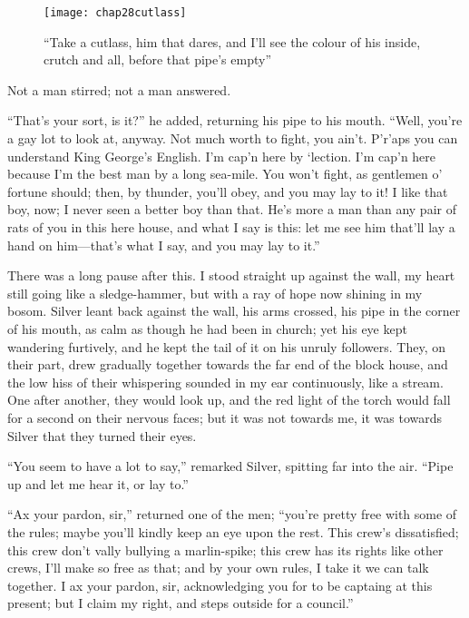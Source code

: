 \begin{sidewaysfigure}
\texttt{[image: chap28cutlass]}%
\caption[\enquote{Take a cutlass, him that dares}]{\enquote{Take a cutlass, him that dares, and I’ll see the colour of his inside, crutch and all, before that pipe’s empty}}
\end{sidewaysfigure} 

Not a man stirred; not a man answered.

\enquote{That’s your sort, is it?} he added, returning his pipe to his mouth. \enquote{Well, you’re a gay lot to look at, anyway. Not much worth to fight, you ain’t. P’r’aps you can understand King George’s English. I’m cap’n here by `lection. I’m cap’n here because I’m the best man by a long sea-mile. You won’t fight, as gentlemen o’ fortune should; then, by thunder, you’ll obey, and you may lay to it! I like that boy, now; I never seen a better boy than that. He’s more a man than any pair of rats of you in this here house, and what I say is this: let me see him that’ll lay a hand on him---that’s what I say, and you may lay to it.}

There was a long pause after this. I stood straight up against the wall, my heart still going like a sledge-hammer, but with a ray of hope now shining in my bosom. Silver leant back against the wall, his arms crossed, his pipe in the corner of his mouth, as calm as though he had been in church; yet his eye kept wandering furtively, and he kept the tail of it on his unruly followers. They, on their part, drew gradually together towards the far end of the block house, and the low hiss of their whispering sounded in my ear continuously, like a stream. One after another, they would look up, and the red light of the torch would fall for a second on their nervous faces; but it was not towards me, it was towards Silver that they turned their eyes.

\enquote{You seem to have a lot to say,} remarked Silver, spitting far into the air. \enquote{Pipe up and let me hear it, or lay to.}

\enquote{Ax your pardon, sir,} returned one of the men; \enquote{you’re pretty free with some of the rules; maybe you’ll kindly keep an eye upon the rest. This crew’s dissatisfied; this crew don’t vally bullying a marlin-spike; this crew has its rights like other crews, I’ll make so free as that; and by your own rules, I take it we can talk together. I ax your pardon, sir, acknowledging you for to be captaing at this present; but I claim my right, and steps outside for a council.}

